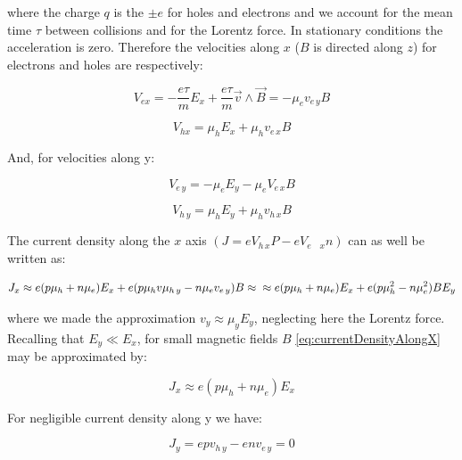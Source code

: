 \documentclass[]{book}
\begin{document}
where the charge \(q\) is the \(\pm e\) for holes and electrons and we
account for the mean time \(\tau\) between collisions and for the
Lorentz force. In stationary conditions the acceleration is zero.
Therefore the velocities along \(x\) (\(B\) is directed along \(z\)) for
electrons and holes are respectively:

\begin{equation}
V_{ex}=-\frac{e\tau}{m}E_x+\frac{e\tau}{m}\vec{v}\wedge\vec{B}=-\mu_e v_{e\, y}B
\label{eq:XvelocitiesForElectrons}
\end{equation}

\begin{equation}
V_{hx}=\mu_h E_x+\mu_h v_{e\, x}B
\label{eq:XvelocitiesForHoles}
\end{equation}

And, for velocities along y:

\begin{equation}
V_{ e \, y} = -\mu_e E_y- \mu_e V_{e \, x} B
\label{eq:YvelocitiesForElectrons}
\end{equation}

\begin{equation}
V_{h \, y} = \mu_h E_y + \mu_h v_{h \, x}B
\label{eq:YvelocitiesForHoles}
\end{equation}

The current density along the \(x\) axis
\((J = e V_{h \, x} P - eV_{e \quad x} n)\) can as well be written as:

\begin{equation}
J_x \approx e(p \mu_h + n \mu_e)E_x + e(p \mu_h v \mu_{h \, y} - n \mu_e v_{e \, y})B \approx \\
\approx e ( p \mu_h + n \mu_e) E_x + e (p \mu_h^2 -n \mu_e^2 )BE_y
\label{eq:currentDensityAlongX}
\end{equation}

where we made the approximation \(v_y \approx \mu_y E_y\), neglecting
here the Lorentz force. Recalling that \(E_y \ll E_x\), for small
magnetic fields \(B\) \eqref{eq:currentDensityAlongX} may be approximated
by:

\begin{equation}
J_x \approx e(p \mu_h + n \mu_e) E_x
\label{eq:currentDensityAlongXaproxymated}
\end{equation}

For negligible current density along y we have:

\begin{equation}
J_y = e p v_{h \, y} - env_{e \, y} = 0
\label{eq:currentDensityAlongYNegligible}
\end{equation}
\end{document}
